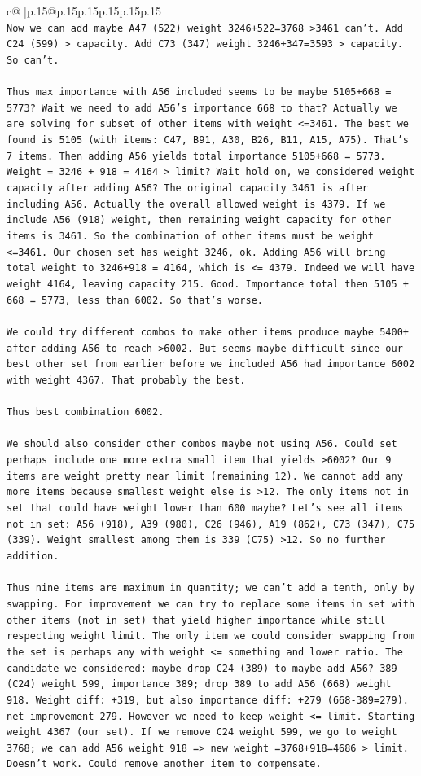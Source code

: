 \documentclass{article}
\begin{document}
{\begin{supertabular}{c@{$\;$}|p{.15\linewidth}@{}p{.15\linewidth}p{.15\linewidth}p{.15\linewidth}p{.15\linewidth}p{.15\linewidth}}
{{{\\ 
\texttt{Now we can add maybe A47 (522) weight 3246+522=3768 >3461 can't. Add C24 (599) > capacity. Add C73 (347) weight 3246+347=3593 > capacity. So can't.} \\
\\ 
\texttt{Thus max importance with A56 included seems to be maybe 5105+668 = 5773? Wait we need to add A56's importance 668 to that? Actually we are solving for subset of other items with weight <=3461. The best we found is 5105 (with items: C47, B91, A30, B26, B11, A15, A75). That's 7 items. Then adding A56 yields total importance 5105+668 = 5773. Weight = 3246 + 918 = 4164 > limit? Wait hold on, we considered weight capacity after adding A56? The original capacity 3461 is after including A56. Actually the overall allowed weight is 4379. If we include A56 (918) weight, then remaining weight capacity for other items is 3461. So the combination of other items must be weight <=3461. Our chosen set has weight 3246, ok. Adding A56 will bring total weight to 3246+918 = 4164, which is <= 4379. Indeed we will have weight 4164, leaving capacity 215. Good. Importance total then 5105 + 668 = 5773, less than 6002. So that's worse.} \\
\\ 
\texttt{We could try different combos to make other items produce maybe 5400+ after adding A56 to reach >6002. But seems maybe difficult since our best other set from earlier before we included A56 had importance 6002 with weight 4367. That probably the best.} \\
\\ 
\texttt{Thus best combination 6002.} \\
\\ 
\texttt{We should also consider other combos maybe not using A56. Could set perhaps include one more extra small item that yields >6002? Our 9 items are weight pretty near limit (remaining 12). We cannot add any more items because smallest weight else is >12. The only items not in set that could have weight lower than 600 maybe? Let's see all items not in set: A56 (918), A39 (980), C26 (946), A19 (862), C73 (347), C75 (339). Weight smallest among them is 339 (C75) >12. So no further addition.} \\
\\ 
\texttt{Thus nine items are maximum in quantity; we can't add a tenth, only by swapping. For improvement we can try to replace some items in set with other items (not in set) that yield higher importance while still respecting weight limit. The only item we could consider swapping from the set is perhaps any with weight <= something and lower ratio. The candidate we considered: maybe drop C24 (389) to maybe add A56? 389 (C24) weight 599, importance 389; drop 389 to add A56 (668) weight 918. Weight diff: +319, but also importance diff: +279 (668{-}389=279). net improvement 279. However we need to keep weight <= limit. Starting weight 4367 (our set). If we remove C24 weight 599, we go to weight 3768; we can add A56 weight 918 => new weight =3768+918=4686 > limit. Doesn't work. Could remove another item to compensate.} \\
}}}
\end{supertabular}}
\end{document}
